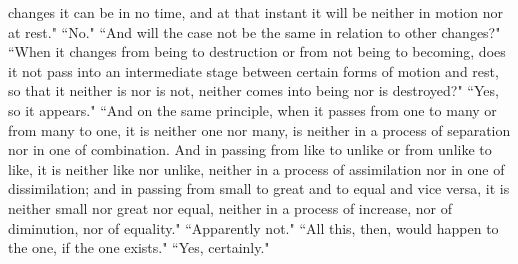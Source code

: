 \documentclass[letterpaper,12pt]{article}
\newcommand{\stephpag}[1]{\marginnote{\small\itshape\fontfamily{ppl}\selectfont #1}}
\begin{document}
changes it can be in no time, and at that instant it will be neither in motion nor at rest." ``No." ``And will the case not be the same in relation to other changes?" ``When it changes from being to destruction \stephpag{157 a} or from not being to becoming, does it not pass into an intermediate stage between certain forms of motion and rest, so that it neither is nor is not, neither comes into being nor is destroyed?" ``Yes, so it appears." ``And on the same principle, when it passes from one to many or from many to one, it is neither one nor many, is neither in a process of separation nor in one of combination. And in passing from like to unlike or from unlike to like, it is neither like nor unlike, neither in a process of assimilation nor in one of dissimilation; \stephpag{b} and in passing from small to great and to equal and vice versa, it is neither small nor great nor equal, neither in a process of increase, nor of diminution, nor of equality." ``Apparently not." ``All this, then, would happen to the one, if the one exists." ``Yes, certainly."
\end{document}
